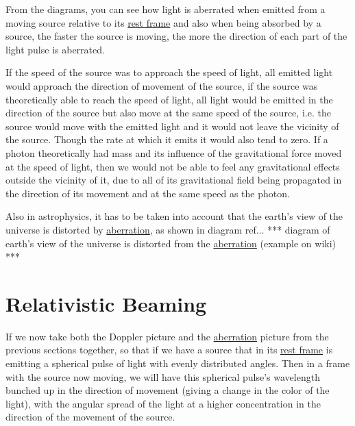From the diagrams, you can see how light is aberrated when emitted from a moving source relative to its \hyperlink{def-proper-frame}{rest frame} and also when being absorbed by a source, the faster the source is moving, the more the direction of each part of the light pulse is aberrated.

If the speed of the source was to approach the speed of light, all emitted light would approach the direction of movement of the source, if the source was theoretically able to reach the speed of light, all light would be emitted in the direction of the source but also move at the same speed of the source, i.e. the source would move with the emitted light and it would not leave the vicinity of the source. Though the rate at which it emits it would also tend to zero. If a photon theoretically had mass and its influence of the gravitational force moved at the speed of light, then we would not be able to feel any gravitational effects outside the vicinity of it, due to all of its gravitational field being propagated in the direction of its movement and at the same speed as the photon.

Also in astrophysics, it has to be taken into account that the earth's view of the universe is distorted by \hyperlink{def-aberration}{aberration}, as shown in diagram ref{...} *** diagram of earth's view of the universe is distorted from the \hyperlink{def-aberration}{aberration} (example on wiki) ***

\section{Relativistic Beaming}

If we now take both the Doppler picture and the \hyperlink{def-aberration}{aberration} picture from the previous sections together, so that if we have a source that in its \hyperlink{def-proper-frame}{rest frame} is emitting a spherical pulse of light with evenly distributed angles. Then in a frame with the source now moving, we will have this spherical pulse's wavelength bunched up in the direction of movement (giving a change in the color of the light), with the angular spread of the light at a higher concentration in the direction of the movement of the source.

